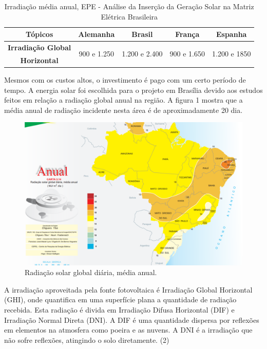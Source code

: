 \begin{table}[H]
\centering
\begin{tabular}{|c|c|c|c|c|}
\hline 
\textbf{Tópicos} & \textbf{Alemanha} & \textbf{Brasil} & \textbf{França} & \textbf{Espanha}\tabularnewline
\hline
\hline 
\textbf{Irradiação Global} & \multirow{2}{*}{900 e 1.250} & \multirow{2}{*}{1.200 e 2.400} & \multirow{2}{*}{900 e 1.650} & \multirow{2}{*}{1.200 e 1850}\tabularnewline
\textbf{Horizontal\nicefrac{\nicefrac{\si{\kilo\watt\hour}}{\si{\meter}$^2$}}{ano}} &  &  &  & \tabularnewline
\hline 
\end{tabular}
\caption{Irradiação média anual, EPE - Análise da Inserção da Geração Solar na Matriz Elétrica Brasileira}
\label{irradiacao_media_anual}
\end{table}

Mesmos com os custos altos, o investimento é pago com um certo período de tempo. A energia solar foi escolhida para o projeto em Brasília devido aos estudos feitos em relação a radiação global anual na região. A figura 1 mostra que a média anual de radiação incidente nesta área é de aproximadamente 20 dia.

\begin{figure}[H]
\centering
\includegraphics[width=.7\linewidth,keepaspectratio,angle=0]{figuras/radiacao_solar.eps}
\caption{Radiação solar global diária, média anual.}
\end{figure}

	A irradiação aproveitada pela fonte fotovoltaica é Irradiação Global Horizontal (GHI), onde quantifica em uma superfície plana a quantidade de radiação recebida. Esta radiação é divida em Irradiação Difusa Horizontal (DIF) e Irradiação Normal Direta (DNI). A DIF é uma quantidade dispersa por reflexões em elementos na atmosfera como poeira e as nuvens. A DNI é a irradiação que não sofre reflexões, atingindo o solo diretamente. (2)

